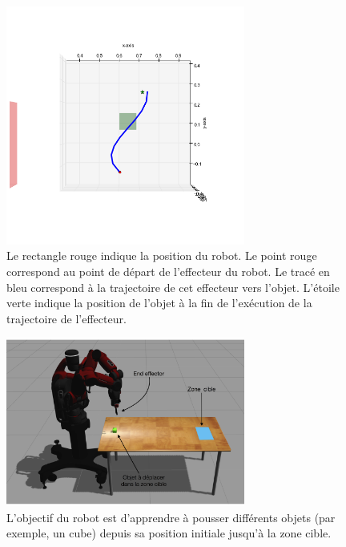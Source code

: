 \documentclass{llncs}
\begin{document}
\begin{figure}[ht]
  \begin{center}
  \includegraphics[width=0.7\textwidth]{figures/ns_trajectory.png}
  \caption{Le rectangle rouge indique la position du robot. Le point rouge correspond au point de départ de l'effecteur du robot. Le tracé en bleu correspond à la trajectoire de cet effecteur vers l'objet. L'étoile verte indique la position de l'objet à la fin de l'exécution de la trajectoire de l'effecteur.}
  \label{fig:ns_traj}
  \end{center}
\end{figure}

\begin{figure}[ht]
  \begin{center}
  \includegraphics[width=0.7\textwidth]{figures/Experiment_setup_annoted_FR.png}
  \caption{L'objectif du robot est d'apprendre à pousser différents objets (par exemple, un cube) depuis sa position initiale jusqu'à la zone cible.}
  \label{fig7}
  \end{center}
\end{figure}
\end{document}
